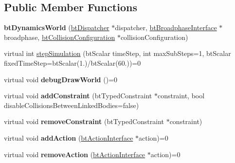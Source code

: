 \subsection*{Public Member Functions}
\begin{DoxyCompactItemize}
\item 
\mbox{\label{classbtDynamicsWorld_ade9becb7e4f919d56a8c261baf560896}} 
{\bfseries bt\+Dynamics\+World} (\hyperlink{classbtDispatcher}{bt\+Dispatcher} $\ast$dispatcher, \hyperlink{classbtBroadphaseInterface}{bt\+Broadphase\+Interface} $\ast$broadphase, \hyperlink{classbtCollisionConfiguration}{bt\+Collision\+Configuration} $\ast$collision\+Configuration)
\item 
virtual int \hyperlink{classbtDynamicsWorld_a5ab26a0d6e8b2b21fbde2ed8f8dd6294}{step\+Simulation} (bt\+Scalar time\+Step, int max\+Sub\+Steps=1, bt\+Scalar fixed\+Time\+Step=bt\+Scalar(1.)/bt\+Scalar(60.))=0
\item 
\mbox{\label{classbtDynamicsWorld_a392b087f91a91a9b46a63ac790f72b80}} 
virtual void {\bfseries debug\+Draw\+World} ()=0
\item 
\mbox{\label{classbtDynamicsWorld_aafdfed3d693792d9280251ff8b9ae0d8}} 
virtual void {\bfseries add\+Constraint} (bt\+Typed\+Constraint $\ast$constraint, bool disable\+Collisions\+Between\+Linked\+Bodies=false)
\item 
\mbox{\label{classbtDynamicsWorld_a89e0f17523fc4d65428545644f7e2515}} 
virtual void {\bfseries remove\+Constraint} (bt\+Typed\+Constraint $\ast$constraint)
\item 
\mbox{\label{classbtDynamicsWorld_ad8eea68a1bcbe55e6520aa3dee44a519}} 
virtual void {\bfseries add\+Action} (\hyperlink{classbtActionInterface}{bt\+Action\+Interface} $\ast$action)=0
\item 
\mbox{\label{classbtDynamicsWorld_a391b665d8ceae4d793fa213c87b5461f}} 
virtual void {\bfseries remove\+Action} (\hyperlink{classbtActionInterface}{bt\+Action\+Interface} $\ast$action)=0
\item 
\mbox{\label{classbtDynamicsWorld_aee63562f8067022cca1b4999057c4373}} 

\end{DoxyCompactItemize}
